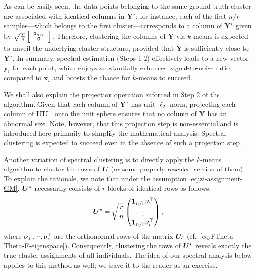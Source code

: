 %
As can be easily seen, the data points belonging to the same ground-truth cluster are associated with identical columns in $\bm{Y}^{\star}$;
for instance, each of the first $n/r$ samples---which belongs to the first cluster---corresponds to a column of $\bm{Y}^{\star}$ given by
$\sqrt{\frac{r}{n}}\,  {\scriptsize \left[\begin{array}{c}
\bm{1}_{n/r}\\
\bm{0}
\end{array}\right]}$.
%
Therefore, clustering  the columns of $\bm{Y}$ via $k$-means is expected to unveil the underlying cluster structure,
provided that $\bm{Y}$ is sufficiently close to $\bm{Y}^{\star}$.
In summary,  spectral estimation (Steps 1-2) effectively leads to a new vector $\bm{y}_i$ for each point, which enjoys substantially enhanced signal-to-noise ratio compared to $\bm{x}_i$ and boosts the chance for $k$-means to succeed.


We shall also explain the projection operation enforced in Step 2 of the algorithm.
Given that each column of $\bm{Y}^{\star} $ has unit $\ell_2$ norm, projecting each column of  $ \bm{U}\bm{U}^{\top}$ onto the unit sphere ensures that no column of $\bm{Y}$ has an abnormal size.
Note, however, that this projection step is  non-essential and is introduced here 
primarily to simplify the mathematical analysis. Spectral clustering is expected to succeed even in the absence of such a projection step \citep{loffler2019optimality}.



\begin{remark}
	Another variation of spectral clustering is to directly apply the $k$-means algorithm to cluster the rows of ${\boldsymbol U}$ (or some properly rescaled version of them) \citep{loffler2019optimality}.  To explain the rationale, we note that under the assumption \eqref{eq:zi-assignment-GM}, ${\boldsymbol U}^{\star}$ necessarily consists of $r$ blocks of identical rows as follows:
$$
	{\boldsymbol U}^{\star} = \sqrt{\frac{r}{n}} \begin{pmatrix}
		\bm{1}_{n/r} \bm{\nu}_1^\top\\
   	\vdots\\
   	\bm{1} _{n/r} \bm{\nu}_r^\top
   \end{pmatrix} ,
$$
where $\bm{\nu}_1^\top, \cdots, \bm{\nu}_r^\top$ are the orthonormal rows of the matrix ${\boldsymbol U}_\theta$ (cf.~\eqref{eq:FTheta-Theta-F-eigenspace}).
Consequently,  clustering the rows of ${\boldsymbol U}^{\star}$ reveals exactly the true cluster assignments of all individuals.
The idea of our spectral analysis below applies to this method as well; we leave it to the reader as an exercise.
\end{remark}


